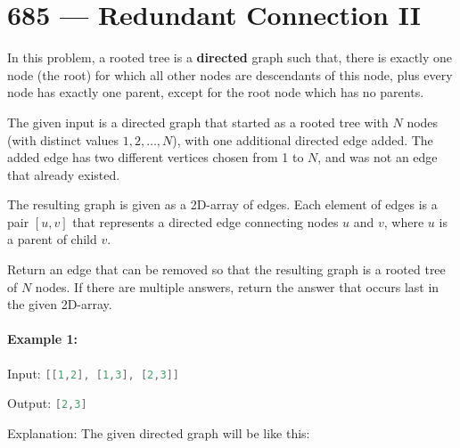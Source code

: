 \section{685 --- Redundant Connection II}
In this problem, a rooted tree is a \textbf{directed} graph such that, there is exactly one node (the root) for which all other nodes are descendants of this node, plus every node has exactly one parent, except for the root node which has no parents.

The given input is a directed graph that started as a rooted tree with $ N $ nodes (with distinct values $ 1, 2, \ldots, N $), with one additional directed edge added. The added edge has two different vertices chosen from 1 to $ N $, and was not an edge that already existed.

The resulting graph is given as a 2D-array of edges. Each element of edges is a pair $ [u, v] $ that represents a directed edge connecting nodes $ u $ and $ v $, where $ u $ is a parent of child $ v $.

Return an edge that can be removed so that the resulting graph is a rooted tree of $ N $ nodes. If there are multiple answers, return the answer that occurs last in the given 2D-array.

\paragraph{Example 1:}

\begin{flushleft}
Input: \lstinline[language=C++, basicstyle=\small\ttfamily, keywordstyle=\bfseries\color{green!40!black}]|[[1,2], [1,3], [2,3]]|

Output: \lstinline[language=C++, basicstyle=\small\ttfamily, keywordstyle=\bfseries\color{green!40!black}]|[2,3]|

Explanation: The given directed graph will be like this:

\begin{figure}[H]
\end{figure}

\end{flushleft}


